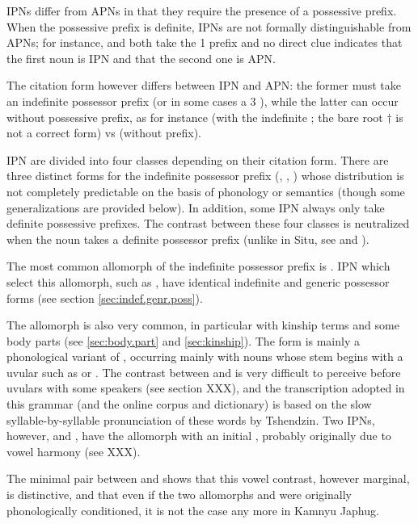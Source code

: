 IPNs differ from APNs in that they require the presence of a possessive prefix.  When the possessive prefix is definite, IPNs are not formally distinguishable from APNs; for instance,  and  both take the 1\sg{}  prefix and no direct clue indicates that the first noun is IPN and that the second one is APN.

The citation form however differs between IPN and APN: the former must take an indefinite possessor prefix (or in some cases a 3\sg{} ), while the latter can occur without possessive prefix, as for instance  (with the indefinite ; the bare root $\dagger$ is not a correct form) vs  (without prefix).

IPN are divided into four classes depending on their citation form. There are three distinct forms for the indefinite possessor prefix (, , ) whose distribution is not completely predictable on the basis of phonology or semantics (though some generalizations are provided below). In addition, some IPN always only take definite possessive prefixes. The contrast between these four classes is neutralized when the noun takes a definite possessor prefix (unlike in Situ, see \citealt[168-169]{linxr93jiarongen} and \citealt[118-119]{prins16kyomkyo}).

The most common allomorph of the indefinite possessor prefix is . IPN which select this allomorph, such as , have identical indefinite and generic possessor forms (see section \ref{sec:indef.genr.poss}).

The allomorph  is also very common, in particular with kinship terms and some body parts (see \ref{sec:body.part} and \ref{sec:kinship}). The form  is mainly a phonological variant of , occurring mainly with nouns whose stem begins with a uvular such as  or . The contrast between  and  is very difficult to perceive before uvulars with some speakers (see section XXX), and the transcription adopted in this grammar (and the online corpus and dictionary) is based on the slow syllable-by-syllable pronunciation of these words by Tshendzin. Two IPNs, however,  and , have the  allomorph with an initial , probably originally due to vowel harmony (see XXX).

The minimal pair between  and  shows that this vowel contrast, however marginal, is distinctive, and that even if the two allomorphs  and  were originally phonologically conditioned, it is not the case any more in Kamnyu Japhug.

